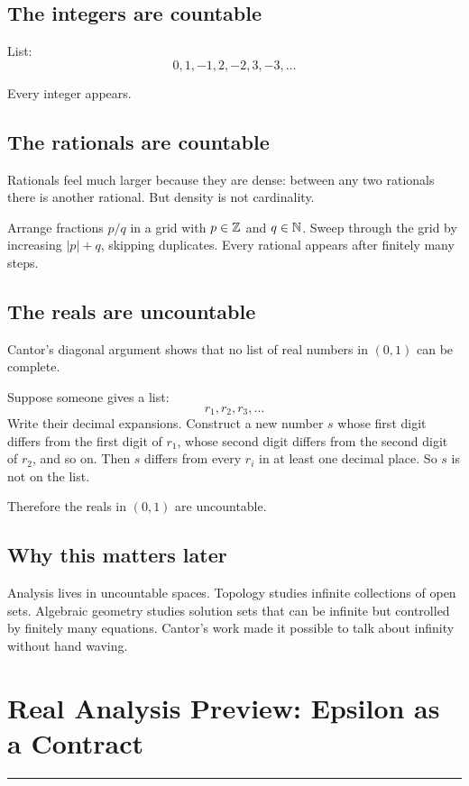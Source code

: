 \documentclass[12pt]{article}
\newcommand{\chapterline}{\vspace{0.4em}\hrule\vspace{0.8em}}
\begin{document}
\subsection{The integers are countable}

List:
\[
0,1,-1,2,-2,3,-3,\ldots
\]

Every integer appears.

\subsection{The rationals are countable}

Rationals feel much larger because they are dense: between any two rationals there is another rational. But density is not cardinality.

Arrange fractions $p/q$ in a grid with $p\in\mathbb{Z}$ and $q\in\mathbb{N}$. Sweep through the grid by increasing $|p|+q$, skipping duplicates. Every rational appears after finitely many steps.

\subsection{The reals are uncountable}

Cantor's diagonal argument shows that no list of real numbers in $(0,1)$ can be complete.

Suppose someone gives a list:
\[
r_1,r_2,r_3,\ldots
\]
Write their decimal expansions. Construct a new number $s$ whose first digit differs from the first digit of $r_1$, whose second digit differs from the second digit of $r_2$, and so on. Then $s$ differs from every $r_i$ in at least one decimal place. So $s$ is not on the list.

Therefore the reals in $(0,1)$ are uncountable.

\subsection{Why this matters later}

Analysis lives in uncountable spaces. Topology studies infinite collections of open sets. Algebraic geometry studies solution sets that can be infinite but controlled by finitely many equations. Cantor's work made it possible to talk about infinity without hand waving.

\newpage
\section{Real Analysis Preview: Epsilon as a Contract}
\chapterline
\end{document}
